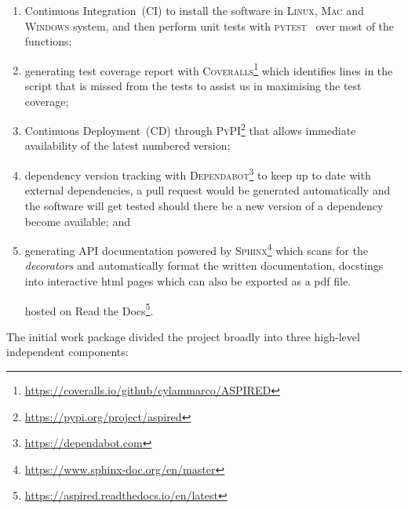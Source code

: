 \documentclass[linenumbers, twocolumn]{aastex631}
\begin{document}
\begin{enumerate}
    \item Continuous Integration~(CI) to install the software in \textsc{Linux},
    \textsc{Mac} and \textsc{Windows} system, and then perform unit tests with
    \textsc{pytest}~\citep{pytest6.2} over most of the functions;
    \item generating test coverage report with \textsc{Coveralls}\footnote{\url{
    https://coveralls.io/github/cylammarco/ASPIRED}} which identifies lines in
    the script that is missed from the tests to assist us in maximising the test
    coverage;
    \item Continuous Deployment~(CD) through \textsc{PyPI}\footnote{\url{
    https://pypi.org/project/aspired}} that allows immediate availability of the
    latest numbered version;
    \item dependency version tracking with \textsc{Dependabot}\footnote{\url{
    https://dependabot.com}} to keep up to date with external dependencies, a
    pull request would be generated automatically and the software will get
    tested should there be a new version of a dependency become available; and
    \item generating API documentation powered by \textsc{Sphinx}\footnote{\url{
    https://www.sphinx-doc.org/en/master}} which scans for the \textit{decorators}
    and automatically format the written documentation, docstings into
    interactive html pages which can also be exported as a pdf file.
    
    
    
    hosted on Read the Docs\footnote{\url{
    https://aspired.readthedocs.io/en/latest}}.
\end{enumerate}

The initial work package divided the project broadly into three high-level
independent components:

\end{document}
